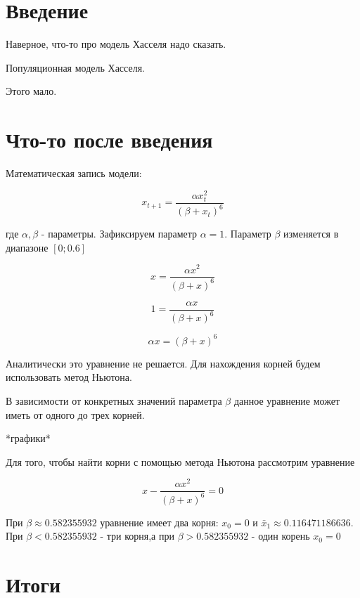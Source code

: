 \section{Введение}

    Наверное, что-то про модель Хасселя надо сказать.

    Популяционная модель Хасселя.

    Этого мало.

\section{Что-то после введения}

    Математическая запись модели:

    \[x_{t+1} = \frac{\alpha x_t^2}{(\beta + x_t)^6}\]

    где \(\alpha, \beta\) - параметры. Зафиксируем параметр \(\alpha = 1\). Параметр \(\beta\) изменяется в диапазоне \([0; 0.6]\)    

    \begin{equation}
        \label{eq1}
        x = \frac{\alpha x^2}{(\beta + x)^6}
    \end{equation}
    
    \[1 = \frac{\alpha x}{(\beta + x)^6}\]

    \[\alpha x = (\beta + x)^6\]

    Аналитически это уравнение не решается. Для нахождения корней будем использовать метод Ньютона.

    В зависимости от конкретных значений параметра \(\beta\) данное уравнение может иметь от одного до трех корней.
    
    *графики*

    Для того, чтобы найти корни с помощью метода Ньютона рассмотрим уравнение 
    
    \[x - \frac{\alpha x^2}{(\beta + x)^6} = 0\]

    При \(\beta \approx 0.582355932\) уравнение имеет два корня: \(x_0 = 0\) и \(\bar{x}_1 \approx 0.116471186636\). При \(\beta < 0.582355932\) - три корня,а при \(\beta > 0.582355932\) - один корень \(x_0 = 0\)   

\section{Итоги}